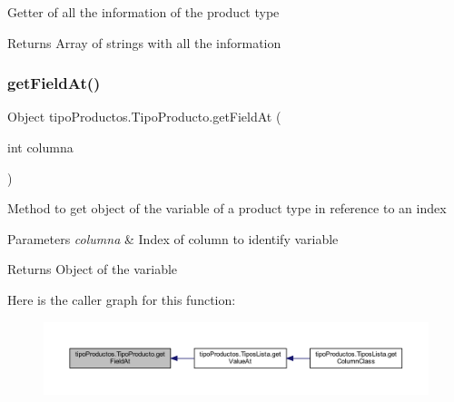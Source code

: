 Getter of all the information of the product type

\begin{DoxyReturn}{Returns}
Array of strings with all the information 
\end{DoxyReturn}
\mbox{\label{classtipo_productos_1_1_tipo_producto_a6e1ecdc3c8d5f65c0859485418e14cd6}} 
\subsubsection{\texorpdfstring{get\+Field\+At()}{getFieldAt()}}
{\footnotesize\ttfamily Object tipo\+Productos.\+Tipo\+Producto.\+get\+Field\+At (\begin{DoxyParamCaption}\item[{int}]{columna }\end{DoxyParamCaption})}

Method to get object of the variable of a product type in reference to an index


\begin{DoxyParams}{Parameters}
{\em columna} & Index of column to identify variable \\
\hline
\end{DoxyParams}
\begin{DoxyReturn}{Returns}
Object of the variable 
\end{DoxyReturn}
Here is the caller graph for this function\+:
\nopagebreak
\begin{figure}[H]
\begin{center}
\leavevmode
\includegraphics[width=350pt]{classtipo_productos_1_1_tipo_producto_a6e1ecdc3c8d5f65c0859485418e14cd6_icgraph}
\end{center}
\end{figure}
\mbox{\label{classtipo_productos_1_1_tipo_producto_acf09300124ea0bcf0ff83000d18a95dc}} 
